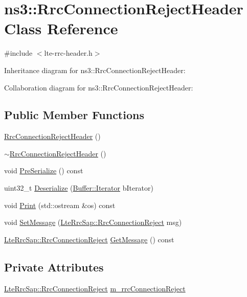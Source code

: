 \hypertarget{classns3_1_1RrcConnectionRejectHeader}{}\section{ns3\+:\+:Rrc\+Connection\+Reject\+Header Class Reference}
\label{classns3_1_1RrcConnectionRejectHeader}


{\ttfamily \#include $<$lte-\/rrc-\/header.\+h$>$}



Inheritance diagram for ns3\+:\+:Rrc\+Connection\+Reject\+Header\+:


Collaboration diagram for ns3\+:\+:Rrc\+Connection\+Reject\+Header\+:
\subsection*{Public Member Functions}
\begin{DoxyCompactItemize}
\item 
\hyperlink{classns3_1_1RrcConnectionRejectHeader_a3343ea52069b5a91fe326f6ea469ff78}{Rrc\+Connection\+Reject\+Header} ()
\item 
\hyperlink{classns3_1_1RrcConnectionRejectHeader_a422fff529e75dc3f68f6a8510df4b88a}{$\sim$\+Rrc\+Connection\+Reject\+Header} ()
\item 
void \hyperlink{classns3_1_1RrcConnectionRejectHeader_af4fcf7ad47cb6281f824dc44691c6a29}{Pre\+Serialize} () const 
\item 
uint32\+\_\+t \hyperlink{classns3_1_1RrcConnectionRejectHeader_aee0fe0a7c91b98ddd6dbd4d9a21aa222}{Deserialize} (\hyperlink{classns3_1_1Buffer_1_1Iterator}{Buffer\+::\+Iterator} b\+Iterator)
\item 
void \hyperlink{classns3_1_1RrcConnectionRejectHeader_a5ca8cb0a9a3176930b6e084f35484ff2}{Print} (std\+::ostream \&os) const 
\item 
void \hyperlink{classns3_1_1RrcConnectionRejectHeader_ad5759cc7590e355987535f7d44dbf73a}{Set\+Message} (\hyperlink{structns3_1_1LteRrcSap_1_1RrcConnectionReject}{Lte\+Rrc\+Sap\+::\+Rrc\+Connection\+Reject} msg)
\item 
\hyperlink{structns3_1_1LteRrcSap_1_1RrcConnectionReject}{Lte\+Rrc\+Sap\+::\+Rrc\+Connection\+Reject} \hyperlink{classns3_1_1RrcConnectionRejectHeader_a62e74fea7378c8e73ed382aa79423025}{Get\+Message} () const 
\end{DoxyCompactItemize}
\subsection*{Private Attributes}
\begin{DoxyCompactItemize}
\item 
\hyperlink{structns3_1_1LteRrcSap_1_1RrcConnectionReject}{Lte\+Rrc\+Sap\+::\+Rrc\+Connection\+Reject} \hyperlink{classns3_1_1RrcConnectionRejectHeader_aabe4cf962d737cab542008b7ded50fc6}{m\+\_\+rrc\+Connection\+Reject}
\end{DoxyCompactItemize}
